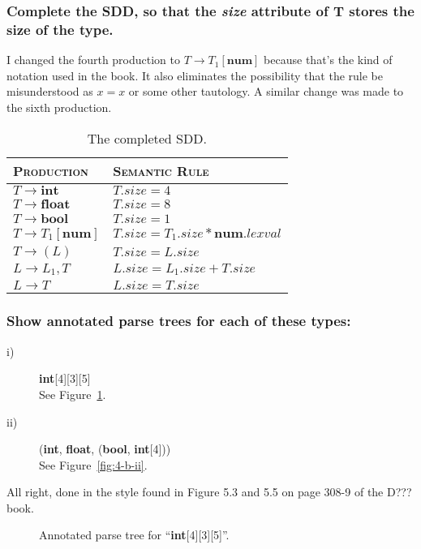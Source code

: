 \subsubsection{Complete the SDD, so that the \textit{size} attribute of T stores the size of the type.}
I changed the fourth production to $T\rightarrow T_{1}[\mathbf{num}]$ because that's the kind of notation used in the book.
It also eliminates the possibility that the rule be misunderstood as $x=x$ or some other tautology.
A similar change was made to the sixth production.
\begin{table}[H]
\centering
\begin{tabular}{l|l}
	\hline \hline
	\textsc{Production} 			& \textsc{Semantic Rule} \\ \hline
	$T \rightarrow \mathbf{int}$			& $T.size = 4$	\\
	$T \rightarrow \mathbf{float}$			& $T.size = 8$	\\
	$T \rightarrow \mathbf{bool}$ 			& $T.size = 1$	\\
	$T \rightarrow T_{1}\mathbf{[num]}$		& $T.size = T_1.size * \mathbf{num}.lexval$\\
	$T \rightarrow (L)$ 					& $T.size = L.size$ \\
	$L \rightarrow L_{1},T$					& $L.size = L_1.size + T.size$	\\
	$L \rightarrow T$						& $L.size = T.size$	\\
	\hline
\end{tabular}
\label{tab:4-a}
\caption{The completed SDD.}
\end{table}

\subsubsection{Show annotated parse trees for each of these types:}
\begin{description}
	\item[i)] \textbf{int}[4][3][5] \\
		See Figure~\ref{fig:4-b-i}.
	\item[ii)] (\textbf{int}, \textbf{float}, (\textbf{bool}, \textbf{int}[4])) \\
		See Figure~\ref{fig:4-b-ii}.
\end{description}

All right, done in the style found in Figure 5.3 and 5.5 on page 308-9 of the \textsc{D???} book.
\begin{figure}[H]

\caption{Annotated parse tree for ``\textbf{int}[4][3][5]''.}
\label{fig:4-b-i}
\end{figure}


